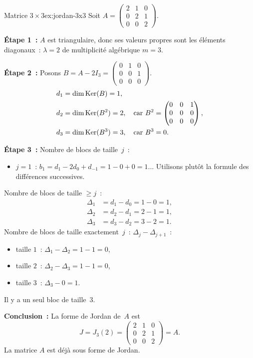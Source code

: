 \begin{example}{Matrice $3\times 3$}{ex:jordan-3x3}
  Soit $A=\begin{pmatrix}2&1&0\\0&2&1\\0&0&2\end{pmatrix}$.

  \textbf{Étape 1~:} $A$ est triangulaire, donc ses valeurs propres sont
  les éléments diagonaux~: $\lambda=2$ de multiplicité algébrique $m=3$.

  \textbf{Étape 2~:} Posons $B=A-2I_3=\begin{pmatrix}0&1&0\\0&0&1\\0&0&0\end{pmatrix}$.
  \begin{align*}
    d_1&=\dim\operatorname{Ker}(B)=1, \\
    d_2&=\dim\operatorname{Ker}(B^2)=2,\quad\text{car }
      B^2=\begin{pmatrix}0&0&1\\0&0&0\\0&0&0\end{pmatrix}, \\
    d_3&=\dim\operatorname{Ker}(B^3)=3,\quad\text{car }B^3=0.
  \end{align*}

  \textbf{Étape 3~:} Nombre de blocs de taille~$j$~:
  \begin{itemize}
    \item $j=1$~: $b_1=d_1-2d_0+d_{-1}=1-0+0=1$... Utilisons
      plutôt la formule des différences successives.
  \end{itemize}
  Nombre de blocs de taille $\geq j$~:
  \begin{align*}
    \Delta_1&=d_1-d_0=1-0=1, \\
    \Delta_2&=d_2-d_1=2-1=1, \\
    \Delta_3&=d_3-d_2=3-2=1.
  \end{align*}
  Nombre de blocs de taille exactement~$j$~: $\Delta_j-\Delta_{j+1}$~:
  \begin{itemize}
    \item taille $1$~: $\Delta_1-\Delta_2=1-1=0$,
    \item taille $2$~: $\Delta_2-\Delta_3=1-1=0$,
    \item taille $3$~: $\Delta_3-0=1$.
  \end{itemize}
  Il y a un seul bloc de taille~$3$.

  \textbf{Conclusion~:} La forme de Jordan de~$A$ est
  \[
    J=J_3(2)=\begin{pmatrix}2&1&0\\0&2&1\\0&0&2\end{pmatrix}=A.
  \]
  La matrice $A$ est déjà sous forme de Jordan.
\end{example}

